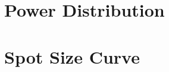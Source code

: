 \thispagestyle{empty}
 


\section{Power Distribution}
\label{app:powwer_distribution}



\section{Spot Size Curve}
\label{app:spot_size}


